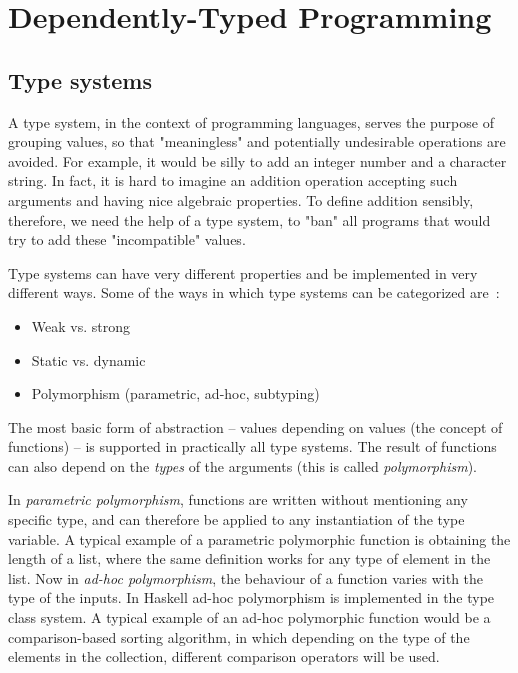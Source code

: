 

    \section{Dependently-Typed Programming}
    \label{sec:dtp}

        \subsection{Type systems}
        \label{subsec:type-systems}
            A type system, in the context of programming languages,
            serves the purpose of grouping values, so that "meaningless" and potentially undesirable operations are avoided.
            For example, it would be silly to add an integer number and a character string.
            In fact, it is hard to imagine an addition operation accepting such arguments and having nice algebraic properties.
            To define addition sensibly, therefore, we need the help of a type system,
            to "ban" all programs that would try to add these "incompatible" values.

            Type systems can have very different properties and be implemented in very different ways.
            Some of the ways in which type systems can be categorized are~\cite{understanding-types-cardelli}:

            \begin{itemize}
                \item Weak vs. strong
                \item Static vs. dynamic
                \item Polymorphism (parametric, ad-hoc, subtyping)
            \end{itemize}

            The most basic form of abstraction -- values depending on values (the concept of functions) -- is
            supported in practically all type systems.
            The result of functions can also depend on the \emph{types} of the arguments
            (this is called \emph{polymorphism}).

            In \emph{parametric polymorphism}, functions are written without mentioning any specific type,
            and can therefore be applied to any instantiation of the type variable.
            A typical example of a parametric polymorphic function is obtaining the length of a list,
            where the same definition works for any type of element in the list.
            Now in \emph{ad-hoc polymorphism}, the behaviour of a function varies with the type of the inputs.
            In Haskell ad-hoc polymorphism is implemented in the type class system.
            A typical example of an ad-hoc polymorphic function would be a comparison-based sorting algorithm,
            in which depending on the type of the elements in the collection,
            different comparison operators will be used.

